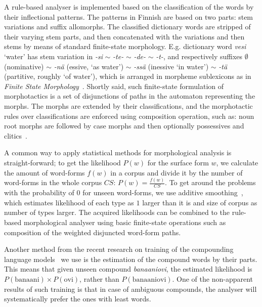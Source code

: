 \documentclass[a4paper,12pt]{article}
\begin{document}
A rule-based analyser is implemented based on the classification of the words
by their inflectional patterns. The patterns in Finnish are based on two parts:
stem variations and suffix allomorphs. The classified dictionary words are
stripped of their varying stem parts, and then concatenated with the variations
and then stems by means of standard finite-state morphology. E.g. dictionary
word \emph{vesi} `water' has stem variation in \emph{-si} $\sim$ \emph{-te-}
$\sim$ \emph{-de-} $\sim$ \emph{-t-}, and respectively suffixes $\emptyset$
(nominative) $\sim$ \emph{-nä} (essive, `as water') $\sim$ \emph{-ssä}
(inessive `in water')  $\sim$ \emph{-tä} (partitive, roughly `of water'), which
is arranged in morpheme sublexicons as in \emph{Finite State
Morphology}~\citep{beesley2003finite}. Shortly said, such finite-state
formulation of morphotactics is a set of disjunctions of paths in the automaton
representing the morphs. The morphs are extended by their classifications, and
the morphotactic rules over classifications are enforced using composition
operation, such as: noun root morphs are followed by case morphs and then
optionally possessives and clitics~\citep{hfst2012}.

A common way to apply statistical methods for morphological analysis is
straight-forward; to get the likelihood $P(w)$ for the surface form $w$, we
calculate the amount of word-forms $f(w)$ in a corpus and divide it by the
number of word-forms in the whole corpus $CS$: $P(w) = \frac{f(w)}{CS}$.  To
get around the problems with the probability of $0$ for unseen word-forms, we
use additive smoothing~\citep{chen1999empirical}, which estimates likelihood of
each type as $1$ larger than it is and size of corpus as number of types
larger. The acquired likelihoods can be combined to the rule-based
morphological analyser using basic finite-state operations such as composition
of the weighted disjuncted word-form paths.

Another method from the recent research on training of the compounding language
models~\citep{pirinen2009weighting} we use is the estimation of the compound
words by their parts. This means that given unseen compound \emph{banaaniovi},
the estimated likelihood is $P(\mathrm{banaani}) \times P(\mathrm{ovi})$,
rather than $P(\mathrm{banaaniovi})$. One of the non-apparent results of such
training is that in case of ambiguous compounds, the analyser will
systematically prefer the ones with least words.
\end{document}

